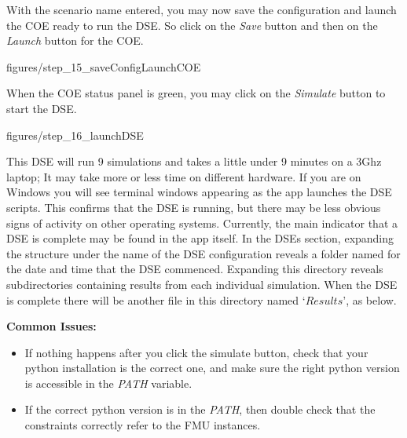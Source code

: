 \documentclass[11pt,a4paper]{../tutorial}
\begin{document}
{\newpage

With the scenario name entered, you may now save the configuration and launch the COE ready to run the DSE.  So click on the \emph{Save} button and then on the \emph{Launch} button for the COE.


\begin{center}\begin{annotation}[width=0.7\linewidth,trim=0 0 0 0,clip]{figures/step_15_saveConfigLaunchCOE}
    \end{annotation}\end{center}


When the COE status panel is green, you may click on the \emph{Simulate} button to start the DSE.



\begin{center}\begin{annotation}[width=0.7\linewidth,trim=0 0 0 0,clip]{figures/step_16_launchDSE}
    \end{annotation}\end{center}

\newpage
This DSE will run 9 simulations and takes a little under 9 minutes on a 3Ghz laptop; It may take more or less time on different hardware. If you are on Windows you will see terminal windows appearing as the app launches the DSE scripts. This confirms that the DSE is running, but there may be less obvious signs of activity on other operating systems.  Currently, the main indicator that a DSE is complete may be found in the app itself.  In the DSEs section, expanding the structure under the name of the DSE configuration reveals a folder named for the date and time that the DSE commenced.  Expanding this directory reveals subdirectories containing results from each individual simulation.  When the DSE is complete there will be another file in this directory named `$Results$’, as below.

\textbf{Common Issues:}
\begin{itemize}
	\item If nothing happens after you click the simulate button, check that your python installation is the correct one, and make sure the right python version is accessible in the \emph{PATH} variable.
	\item If the correct python version is in the \emph{PATH}, then double check that the constraints correctly refer to the FMU instances.
\end{itemize}

}
\end{document}
